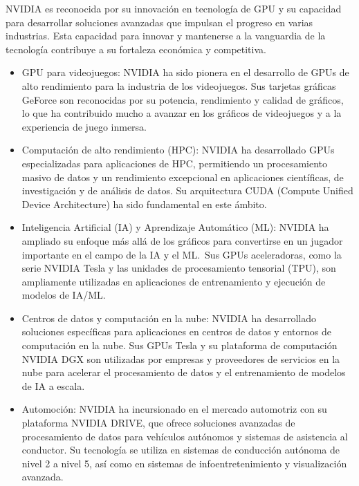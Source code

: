 \documentclass[letterpaper, 12pt]{article}
\begin{document}
NVIDIA es reconocida por su innovación en tecnología de GPU y su
capacidad para desarrollar soluciones avanzadas que impulsan el
progreso en varias industrias. Esta capacidad para innovar y
mantenerse a la vanguardia de la tecnología contribuye a su
fortaleza económica y competitiva.

\begin{itemize}
      \item GPU para videojuegos:
            NVIDIA ha sido pionera en el desarrollo de GPUs de alto rendimiento
            para la industria de los videojuegos. Sus tarjetas gráficas GeForce
            son reconocidas por su potencia, rendimiento y calidad de gráficos,
            lo que ha contribuido mucho a avanzar en los gráficos de videojuegos
            y a la experiencia de juego inmersa.

      \item Computación de alto rendimiento (HPC):
            NVIDIA ha desarrollado GPUs especializadas para aplicaciones de HPC,
            permitiendo un procesamiento masivo de datos y un rendimiento
            excepcional en aplicaciones científicas, de investigación y de
            análisis de datos. Su arquitectura CUDA
            (Compute Unified Device Architecture) ha sido fundamental en este
            ámbito.

      \item Inteligencia Artificial (IA) y Aprendizaje Automático (ML):
            NVIDIA ha ampliado su enfoque más allá de los gráficos para
            convertirse en un jugador importante en el campo de la IA y
            el ML.~Sus GPUs aceleradoras, como la serie NVIDIA Tesla y las
            unidades de procesamiento tensorial (TPU), son ampliamente utilizadas
            en aplicaciones de entrenamiento y ejecución de modelos de IA/ML.\@{}

      \item Centros de datos y computación en la nube:
            NVIDIA ha desarrollado soluciones específicas para aplicaciones
            en centros de datos y entornos de computación en la nube. Sus
            GPUs Tesla y su plataforma de computación NVIDIA DGX son
            utilizadas por empresas y proveedores de servicios en la nube para
            acelerar el procesamiento de datos y el entrenamiento de modelos
            de IA a escala.

      \item Automoción:
            NVIDIA ha incursionado en el mercado automotriz con su plataforma
            NVIDIA DRIVE, que ofrece soluciones avanzadas de procesamiento
            de datos para vehículos autónomos y sistemas de asistencia al
            conductor. Su tecnología se utiliza en sistemas de conducción
            autónoma de nivel 2 a nivel 5, así como en sistemas de
            infoentretenimiento y visualización avanzada.


\end{itemize}
\end{document}

